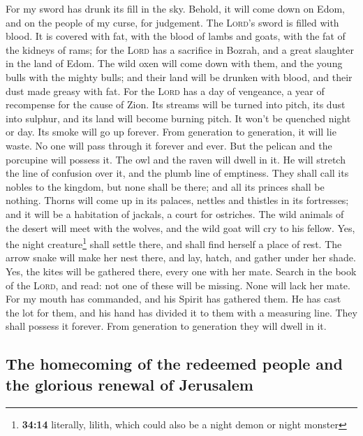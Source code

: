  For my sword has drunk its fill in the sky. Behold, it
will come down on Edom, and on the people of my curse, for judgement.
 The \textsc{Lord}'s sword is filled with blood. It is
covered with fat, with the blood of lambs and goats, with the fat of the
kidneys of rams; for the \textsc{Lord} has a sacrifice in Bozrah, and a
great slaughter in the land of Edom.  The wild oxen will
come down with them, and the young bulls with the mighty bulls; and
their land will be drunken with blood, and their dust made greasy with
fat.  For the \textsc{Lord} has a day of vengeance, a year
of recompense for the cause of Zion.  Its streams will be
turned into pitch, its dust into sulphur, and its land will become
burning pitch.  It won't be quenched night or day. Its
smoke will go up forever. From generation to generation, it will lie
waste. No one will pass through it forever and ever.  But
the pelican and the porcupine will possess it. The owl and the raven
will dwell in it. He will stretch the line of confusion over it, and the
plumb line of emptiness.  They shall call its nobles to
the kingdom, but none shall be there; and all its princes shall be
nothing.  Thorns will come up in its palaces, nettles and
thistles in its fortresses; and it will be a habitation of jackals, a
court for ostriches.  The wild animals of the desert will
meet with the wolves, and the wild goat will cry to his fellow. Yes, the
night creature\footnote{\textbf{34:14} literally, lilith, which could
  also be a night demon or night monster} shall settle there, and shall
find herself a place of rest.  The arrow snake will make
her nest there, and lay, hatch, and gather under her shade. Yes, the
kites will be gathered there, every one with her mate. 
Search in the book of the \textsc{Lord}, and read: not one of these will
be missing. None will lack her mate. For my mouth has commanded, and his
Spirit has gathered them.  He has cast the lot for them,
and his hand has divided it to them with a measuring line. They shall
possess it forever. From generation to generation they will dwell in it.

\hypertarget{the-homecoming-of-the-redeemed-people-and-the-glorious-renewal-of-jerusalem}{%
\subsection{The homecoming of the redeemed people and the glorious
renewal of
Jerusalem}\label{the-homecoming-of-the-redeemed-people-and-the-glorious-renewal-of-jerusalem}}

